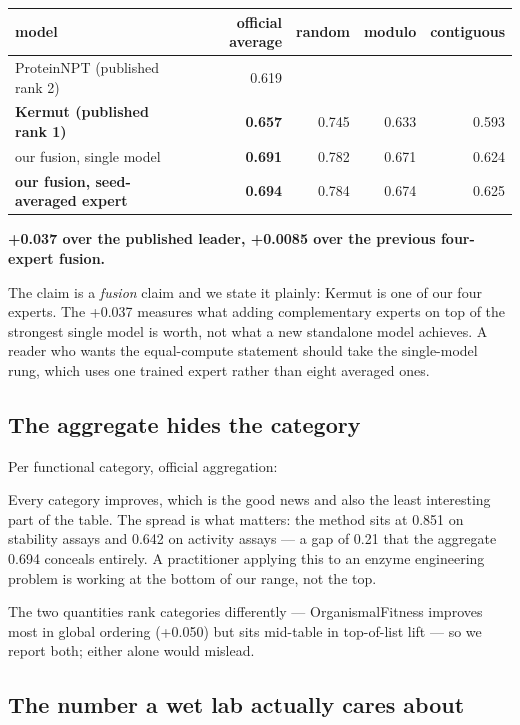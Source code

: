 \documentclass{article}
\begin{document}
\begin{table}[t]
\centering
\small
\begin{tabular}{lrrrr}
\hline
model & official average & random & modulo & contiguous \\
\hline
ProteinNPT (published rank 2) & 0.619 &  &  &  \\
\textbf{Kermut \cite{kermut} (published rank 1)} & \textbf{0.657} & 0.745 & 0.633 & 0.593 \\
our fusion, single model & \textbf{0.691} & 0.782 & 0.671 & 0.624 \\
\textbf{our fusion, seed-averaged expert} & \textbf{0.694} & 0.784 & 0.674 & 0.625 \\
\hline
\end{tabular}
\end{table}

\textbf{+0.037 over the published leader, +0.0085 over the previous four-expert fusion.}

The claim is a \emph{fusion} claim and we state it plainly: Kermut is one of our four experts. The +0.037
measures what adding complementary experts on top of the strongest single model is worth, not what a new
standalone model achieves. A reader who wants the equal-compute statement should take the single-model
rung, which uses one trained expert rather than eight averaged ones.

\subsection{The aggregate hides the category}\label{the-aggregate-hides-the-category}

Per functional category, official aggregation:



Every category improves, which is the good news and also the least interesting part of the table. The
spread is what matters: the method sits at 0.851 on stability assays and 0.642 on activity assays --- a
gap of 0.21 that the aggregate 0.694 conceals entirely. A practitioner applying this to an enzyme
engineering problem is working at the bottom of our range, not the top.

The two quantities rank categories differently --- OrganismalFitness improves most in global ordering
(+0.050) but sits mid-table in top-of-list lift --- so we report both; either alone would mislead.

\subsection{The number a wet lab actually cares about}\label{the-number-a-wet-lab-actually-cares-about}
\end{document}
